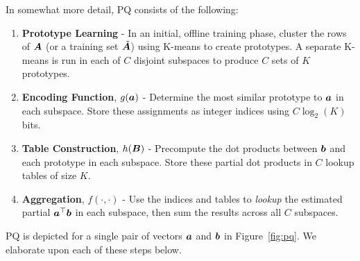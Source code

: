 In somewhat more detail, PQ consists of the following:
\vspace{-3mm}
\begin{enumerate}\itemsep1.5mm
    \item \textbf{Prototype Learning} - In an initial, offline training phase,  cluster the rows of $\bm{A}$ (or a training set $\tilde{\bm{A}}$) using K-means to create prototypes. A separate K-means is run in each of $C$ disjoint subspaces to produce $C$ sets of $K$ prototypes. %
    \item \textbf{Encoding Function}, $g(\bm{a})$ - Determine the most similar prototype to $\bm{a}$ in each subspace. Store these assignments as integer indices using $C \log_2(K)$ bits.
    \item \textbf{Table Construction}, $h(\bm{B})$ - Precompute the dot products between $\bm{b}$ and each prototype in each subspace. Store these partial dot products in $C$ lookup tables of size $K$.
    \item \textbf{Aggregation}, $f(\cdot,\cdot)$ - Use the indices and tables to \textit{lookup} the estimated partial $\bm{a}^\top \bm{b}$ in each subspace, then sum the results across all $C$ subspaces. %
\end{enumerate}
\vspace{-3mm}
PQ is depicted for a single pair of vectors $\bm{a}$ and $\bm{b}$ in Figure~\ref{fig:pq}. We elaborate upon each of these steps below.

\vspace{-2mm}
